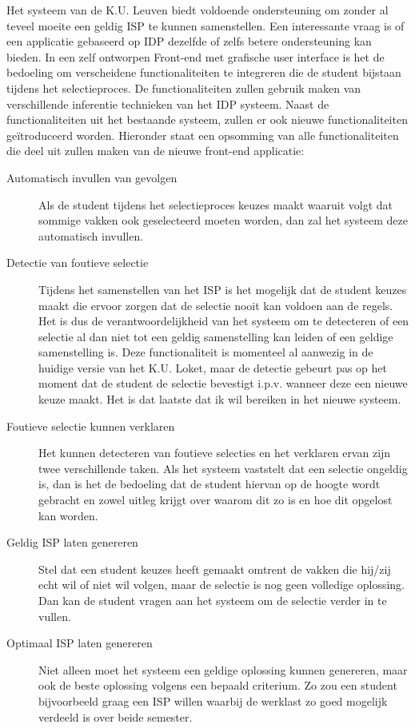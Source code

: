 Het systeem van de K.U. Leuven biedt voldoende ondersteuning om zonder al teveel moeite een geldig ISP te kunnen samenstellen. Een interessante vraag is of een applicatie gebaseerd op IDP dezelfde of zelfs betere ondersteuning kan bieden. In een zelf ontworpen Front-end met grafische user interface is het de bedoeling om verscheidene functionaliteiten te integreren die de student bijstaan tijdens het selectieproces. De functionaliteiten zullen gebruik maken van verschillende inferentie technieken van het IDP systeem. Naast de functionaliteiten uit het bestaande systeem, zullen er ook nieuwe functionaliteiten ge\"{i}troduceerd worden. Hieronder staat een opsomming van alle functionaliteiten die deel uit zullen maken van de nieuwe front-end applicatie:
\begin{description}
\item[Automatisch invullen van gevolgen] Als de student tijdens het selectieproces keuzes maakt waaruit volgt dat sommige vakken ook geselecteerd moeten worden, dan zal het systeem deze automatisch invullen.
\item[Detectie van foutieve selectie] Tijdens het samenstellen van het ISP is het mogelijk dat de student keuzes maakt die ervoor zorgen dat de selectie nooit kan voldoen aan de regels. Het is dus de verantwoordelijkheid van het systeem om te detecteren of een selectie al dan niet tot een geldig samenstelling kan leiden of een geldige samenstelling is. Deze functionaliteit is momenteel al aanwezig in de huidige versie van het K.U. Loket, maar de detectie gebeurt pas op het moment dat de student de selectie bevestigt i.p.v. wanneer deze een nieuwe keuze maakt. Het is dat laatste dat ik wil bereiken in het nieuwe systeem.
\item[Foutieve selectie kunnen verklaren] Het kunnen detecteren van foutieve selecties en het verklaren ervan zijn twee verschillende taken. Als het systeem vaststelt dat een selectie ongeldig is, dan is het de bedoeling dat de student hiervan op de hoogte wordt gebracht en zowel uitleg krijgt over waarom dit zo is en hoe dit opgelost kan worden.
\item[Geldig ISP laten genereren] Stel dat een student keuzes heeft gemaakt omtrent de vakken die hij/zij echt wil of niet wil volgen, maar de selectie is nog geen volledige oplossing. Dan kan de student vragen aan het systeem om de selectie verder in te vullen.
\item[Optimaal ISP laten genereren] Niet alleen moet het systeem een geldige oplossing kunnen genereren, maar ook de beste oplossing volgens een bepaald criterium. Zo zou een student bijvoorbeeld graag een ISP willen waarbij de werklast zo goed mogelijk verdeeld is over beide semester. 

\end{description}
